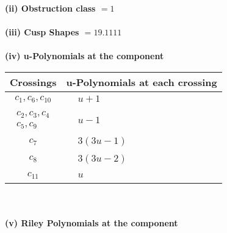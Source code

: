 \documentclass[1p]{elsarticle_modified}
\theoremstyle{definition}
\begin{document}
\flushleft \textbf{(ii) Obstruction class $= 1$}\\~\\
\flushleft \textbf{(iii) Cusp Shapes $= 19.1111$}\\~\\
\newpage\renewcommand{\arraystretch}{1}
\flushleft \textbf{(iv) u-Polynomials at the component}\newline \\
\begin{tabular}{m{50pt}|m{274pt}}
Crossings & \hspace{64pt}u-Polynomials at each crossing \\
\hline $$\begin{aligned}c_{1},c_{6},c_{10}\end{aligned}$$&$\begin{aligned}
&u+1
\end{aligned}$\\
\hline $$\begin{aligned}c_{2},c_{3},c_{4}\\c_{5},c_{9}\end{aligned}$$&$\begin{aligned}
&u-1
\end{aligned}$\\
\hline $$\begin{aligned}c_{7}\end{aligned}$$&$\begin{aligned}
&3(3 u-1)
\end{aligned}$\\
\hline $$\begin{aligned}c_{8}\end{aligned}$$&$\begin{aligned}
&3(3 u-2)
\end{aligned}$\\
\hline $$\begin{aligned}c_{11}\end{aligned}$$&$\begin{aligned}
&u
\end{aligned}$\\
\hline
\end{tabular}\\~\\
\newpage\renewcommand{\arraystretch}{1}
\flushleft \textbf{(v) Riley Polynomials at the component}\newline \\
\end{document}
